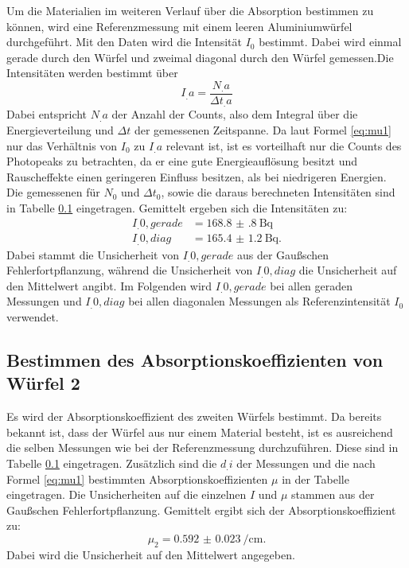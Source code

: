 Um die Materialien im weiteren Verlauf über die Absorption bestimmen zu können, wird eine Referenzmessung mit einem leeren Aluminiumwürfel durchgeführt. Mit den Daten wird die Intensität $I_0$ bestimmt. Dabei wird einmal gerade durch den Würfel und zweimal diagonal durch den Würfel gemessen.Die Intensitäten werden bestimmt über
\begin{equation}
I_.a = \frac{N_.a}{\Delta t_.a}
\end{equation}
Dabei entspricht $N_.a$ der Anzahl der Counts, also dem Integral über die Energieverteilung und $\Delta t$ der gemessenen Zeitspanne. Da laut Formel \eqref{eq:mu1} nur das Verhältnis von $I_0$ zu $I_.a$ relevant ist, ist es vorteilhaft nur die Counts des Photopeaks zu betrachten, da er eine gute Energieauflösung besitzt und Rauscheffekte einen geringeren Einfluss besitzen, als bei niedrigeren Energien.\\
Die gemessenen für $N_0$ und $\Delta t_0$, sowie die daraus berechneten Intensitäten sind in Tabelle \ref{} eingetragen.
Gemittelt ergeben sich die Intensitäten zu:
\begin{align*}
I_.{0,gerade} &= \SI{168.8(8)}{\becquerel} \\
I_.{0,diag} &= \SI{165.4(12)}{\becquerel} \text{.}
\end{align*}
Dabei stammt die Unsicherheit von $I_.{0,gerade}$ aus der Gaußschen Fehlerfortpflanzung, während die Unsicherheit von $I_.{0,diag}$ die Unsicherheit auf den Mittelwert angibt.
Im Folgenden wird $I_.{0,gerade}$ bei allen geraden Messungen und $I_.{0,diag}$ bei allen diagonalen Messungen als Referenzintensität $I_0$ verwendet.

\subsection{Bestimmen des Absorptionskoeffizienten von Würfel 2}

Es wird der Absorptionskoeffizient des zweiten Würfels bestimmt. Da bereits bekannt ist, dass der Würfel aus nur einem Material besteht, ist es ausreichend die selben Messungen wie bei der Referenzmessung durchzuführen. Diese sind in Tabelle \ref{} eingetragen. Zusätzlich sind die $d_.i$ der Messungen und die nach Formel \ref{eq:mu1} bestimmten Absorptionskoeffizienten $\mu$ in der Tabelle eingetragen. Die Unsicherheiten auf die einzelnen $I$ und $\mu$ stammen aus der Gaußschen Fehlerfortpflanzung.
Gemittelt ergibt sich der Absorptionskoeffizient zu:
\[
\mu_2 = \SI{0.592(23)}{\per\centi\metre}\text{.}
\]
Dabei wird die Unsicherheit auf den Mittelwert angegeben.

